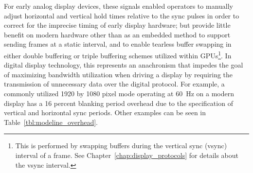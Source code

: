         For early analog display devices, these signals enabled operators to manually adjust horizontal and vertical hold times relative to the sync pulses in order to correct for the imprecise timing of early display hardware; but provide little benefit on modern hardware other than as an embedded method to support sending frames at a static interval, and to enable tearless buffer swapping in either double buffering\cite{FriedbergEtAl1990} or triple buffering schemes\cite{3dfx1997} utilized within GPUs\footnote{This is performed by swapping buffers during the vertical sync (vsync) interval of a frame\cite{3dfx1999,3dfx1999_2}. See Chapter~\ref{chap:display_protocols} for details about the vsync interval.}. In digital display technology, this represents an anachronism that impedes the goal of maximizing bandwidth utilization when driving a display by requiring the transmission of unnecessary data over the digital protocol. For example, a commonly utilized 1920 by 1080 pixel mode operating at \mbox{60 Hz}\cite{MythTVWebsite} on a modern display has a 16 percent blanking period overhead due to the specification of vertical and horizontal sync periods. Other examples can be seen in Table~\ref{tbl:modeline_overhead}.

